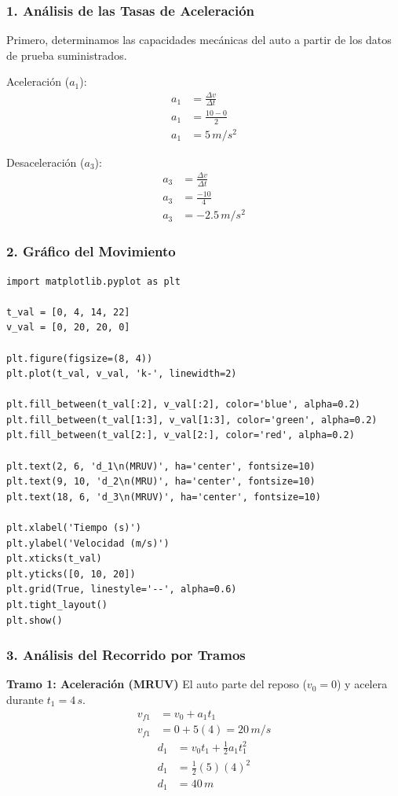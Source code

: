 \documentclass[12pt, a4paper]{article}
\begin{document}
\subsubsection*{1. Análisis de las Tasas de Aceleración}
Primero, determinamos las capacidades mecánicas del auto a partir de los datos de prueba suministrados.

Aceleración ($a_1$):
\begin{align*}
a_1 &= \frac{\Delta v}{\Delta t} \\
a_1 &= \frac{10 - 0}{2} \\
a_1 &= 5 \, \si{m/s^2}
\end{align*}

Desaceleración ($a_3$):
\begin{align*}
a_3 &= \frac{\Delta v}{\Delta t} \\
a_3 &= \frac{-10}{4} \\
a_3 &= -2.5 \, \si{m/s^2}
\end{align*}

\subsubsection*{2. Gráfico del Movimiento}

\begin{lstlisting}
import matplotlib.pyplot as plt

t_val = [0, 4, 14, 22]
v_val = [0, 20, 20, 0]

plt.figure(figsize=(8, 4))
plt.plot(t_val, v_val, 'k-', linewidth=2)

plt.fill_between(t_val[:2], v_val[:2], color='blue', alpha=0.2)
plt.fill_between(t_val[1:3], v_val[1:3], color='green', alpha=0.2)
plt.fill_between(t_val[2:], v_val[2:], color='red', alpha=0.2)

plt.text(2, 6, 'd_1\n(MRUV)', ha='center', fontsize=10)
plt.text(9, 10, 'd_2\n(MRU)', ha='center', fontsize=10)
plt.text(18, 6, 'd_3\n(MRUV)', ha='center', fontsize=10)

plt.xlabel('Tiempo (s)')
plt.ylabel('Velocidad (m/s)')
plt.xticks(t_val)
plt.yticks([0, 10, 20])
plt.grid(True, linestyle='--', alpha=0.6)
plt.tight_layout()
plt.show()
\end{lstlisting}

\subsubsection*{3. Análisis del Recorrido por Tramos}

\textbf{Tramo 1: Aceleración (MRUV)}
El auto parte del reposo ($v_0 = 0$) y acelera durante $t_1 = 4 \, \si{s}$.
\begin{align*}
v_{f1} &= v_0 + a_1 t_1 \\
v_{f1} &= 0 + 5(4) = 20 \, \si{m/s}
\end{align*}
\begin{align*}
d_1 &= v_0 t_1 + \frac{1}{2} a_1 t_1^2 \\
d_1 &= \frac{1}{2}(5)(4)^2 \\
d_1 &= 40 \, \si{m}
\end{align*}
\end{document}
